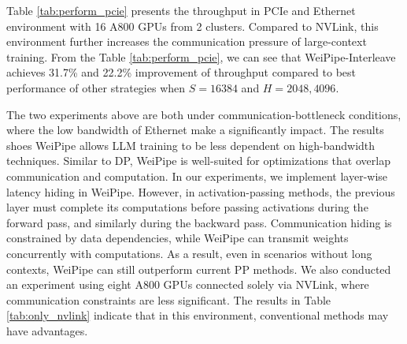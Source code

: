 \documentclass[sigplan,review]{acmart}
\begin{document}
Table \ref{tab:perform_pcie} presents the throughput in PCIe and Ethernet environment with 16 A800 GPUs from 2 clusters. Compared to NVLink, this environment further increases the communication pressure of large-context training. From the Table \ref{tab:perform_pcie}, we can see that WeiPipe-Interleave achieves 31.7\% and 22.2\% improvement of throughput compared to best performance of other strategies when $S=16384$ and $H=2048, 4096$. 

The two experiments above are both under communication-bottleneck conditions, where the low bandwidth of Ethernet make a significantly impact. The results shoes WeiPipe allows LLM training to be less dependent on high-bandwidth techniques. Similar to DP, WeiPipe is well-suited for optimizations that overlap communication and computation. In our experiments, we implement layer-wise latency hiding in WeiPipe. However, in activation-passing methods, the previous layer must complete its computations before passing activations during the forward pass, and similarly during the backward pass. Communication hiding is constrained by data dependencies, while WeiPipe can transmit weights concurrently with computations. As a result, even in scenarios without long contexts, WeiPipe can still outperform current PP methods. We also conducted an experiment using eight A800 GPUs connected solely via NVLink, where communication constraints are less significant. The results in Table \ref{tab:only_nvlink} indicate that in this environment, conventional methods may have advantages.



\end{document}
